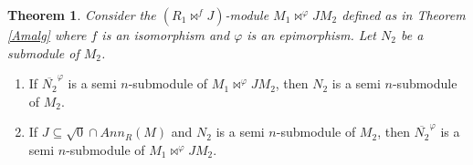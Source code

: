 \documentclass{amsart}%
\newtheorem{theorem}{Theorem}
\theoremstyle{plain}
\numberwithin{equation}{section}
\begin{document}
\begin{theorem}
Consider the $(R_{1}\Join^{f}J)$-module $M_{1}\Join^{\varphi}JM_{2}$ defined
as in Theorem \ref{Amalg} where $f$ is an isomorphism and $\varphi$ is an
epimorphism. Let $N_{2}$ be a submodule of $M_{2}$.
\end{theorem}

\begin{enumerate}
\item If $\overline{N_{2}}^{\varphi}$ is a semi $n$-submodule of $M_{1}%
\Join^{\varphi}JM_{2}$, then $N_{2}$ is a semi $n$-submodule of $M_{2}$.

\item If $J\subseteq\sqrt{0}\cap Ann_{R}(M)$ and $N_{2}$ is a semi
$n$-submodule of $M_{2}$, then $\overline{N_{2}}^{\varphi}$ is a semi
$n$-submodule of $M_{1}\Join^{\varphi}JM_{2}$.
\end{enumerate}
\end{document}
